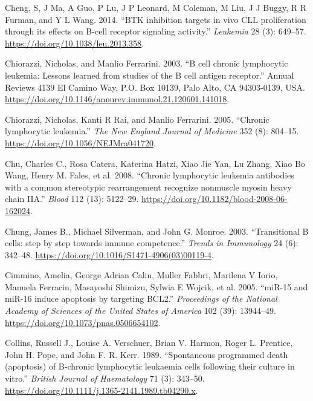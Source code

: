 \documentclass[11pt, a4paper, twosided]{book}
\newenvironment{CSLReferences}%
  {}%
  {\par}
\begin{document}
\begin{CSLReferences}{1}{0}
\leavevmode{}%
Cheng, S, J Ma, A Guo, P Lu, J P Leonard, M Coleman, M Liu, J J Buggy, R R Furman, and Y L Wang. 2014. {``{BTK inhibition targets in vivo CLL proliferation through its effects on B-cell receptor signaling activity}.''} \emph{Leukemia} 28 (3): 649--57. \url{https://doi.org/10.1038/leu.2013.358}.

\leavevmode{}%
Chiorazzi, Nicholas, and Manlio Ferrarini. 2003. {``{B cell chronic lymphocytic leukemia: Lessons learned from studies of the B cell antigen receptor}.''} Annual Reviews 4139 El Camino Way, P.O. Box 10139, Palo Alto, CA 94303-0139, USA. \url{https://doi.org/10.1146/annurev.immunol.21.120601.141018}.

\leavevmode{}%
Chiorazzi, Nicholas, Kanti R Rai, and Manlio Ferrarini. 2005. {``{Chronic lymphocytic leukemia.}''} \emph{The New England Journal of Medicine} 352 (8): 804--15. \url{https://doi.org/10.1056/NEJMra041720}.

\leavevmode{}%
Chu, Charles C., Rosa Catera, Katerina Hatzi, Xiao Jie Yan, Lu Zhang, Xiao Bo Wang, Henry M. Fales, et al. 2008. {``{Chronic lymphocytic leukemia antibodies with a common stereotypic rearrangement recognize nonmuscle myosin heavy chain IIA}.''} \emph{Blood} 112 (13): 5122--29. \url{https://doi.org/10.1182/blood-2008-06-162024}.

\leavevmode{}%
Chung, James B., Michael Silverman, and John G. Monroe. 2003. {``{Transitional B cells: step by step towards immune competence}.''} \emph{Trends in Immunology} 24 (6): 342--48. \url{https://doi.org/10.1016/S1471-4906(03)00119-4}.

\leavevmode{}%
Cimmino, Amelia, George Adrian Calin, Muller Fabbri, Marilena V Iorio, Manuela Ferracin, Masayoshi Shimizu, Sylwia E Wojcik, et al. 2005. {``{miR-15 and miR-16 induce apoptosis by targeting BCL2}.''} \emph{Proceedings of the National Academy of Sciences of the United States of America} 102 (39): 13944--49. \url{https://doi.org/10.1073/pnas.0506654102}.

\leavevmode{}%
Collins, Russell J., Louise A. Verschuer, Brian V. Harmon, Roger L. Prentice, John H. Pope, and John F. R. Kerr. 1989. {``{Spontaneous programmed death (apoptosis) of B‐chronic lymphocytic leukaemia cells following their culture in vitro}.''} \emph{British Journal of Haematology} 71 (3): 343--50. \url{https://doi.org/10.1111/j.1365-2141.1989.tb04290.x}.


\end{CSLReferences}
\end{document}
